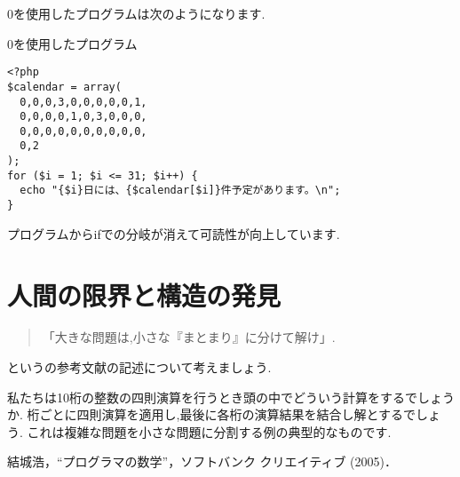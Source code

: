 \documentclass[10pt, twocolumn]{jarticle}
\begin{document}
0を使用したプログラムは次のようになります.

\begin{itembox}[l]{0を使用したプログラム}
\begin{verbatim}
<?php
$calendar = array(
  0,0,0,3,0,0,0,0,0,1,
  0,0,0,0,1,0,3,0,0,0,
  0,0,0,0,0,0,0,0,0,0,
  0,2
);
for ($i = 1; $i <= 31; $i++) {
  echo "{$i}日には、{$calendar[$i]}件予定があります。\n";
}
\end{verbatim}
\end{itembox}

プログラムからifでの分岐が消えて可読性が向上しています.

\section{人間の限界と構造の発見}


\begin{quote}
「大きな問題は,小さな『まとまり』に分けて解け」.
\end{quote}
というの参考文献の記述について考えましょう.

私たちは10桁の整数の四則演算を行うとき頭の中でどういう計算をするでしょうか.
桁ごとに四則演算を適用し,最後に各桁の演算結果を結合し解とするでしょう.
これは複雑な問題を小さな問題に分割する例の典型的なものです.

\begin{thebibliography}{9}
     結城浩，“プログラマの数学”，ソフトバンク クリエイティブ (2005)．
\end{thebibliography}
\end{document}
